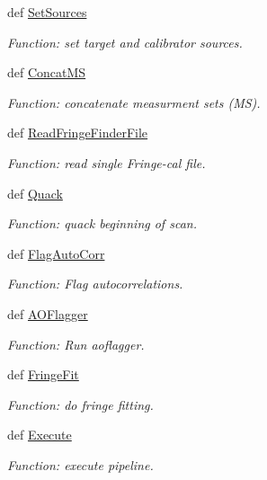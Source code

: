 \begin{DoxyCompactItemize}
def \hyperlink{class_pipeline_1_1_pipeline_a4f45319f19f9fd40aba97cc0bc0bca47}{\-Set\-Sources}
\begin{DoxyCompactList}\small\item\em \-Function\-: set target and calibrator sources. \end{DoxyCompactList}\item 
def \hyperlink{class_pipeline_1_1_pipeline_a0a01f403748ac0aed6bdefec04966766}{\-Concat\-M\-S}
\begin{DoxyCompactList}\small\item\em \-Function\-: concatenate measurment sets (\-M\-S). \end{DoxyCompactList}\item 
def \hyperlink{class_pipeline_1_1_pipeline_ae8a9cee7f6f30619770ec21b88b6e821}{\-Read\-Fringe\-Finder\-File}
\begin{DoxyCompactList}\small\item\em \-Function\-: read single \-Fringe-\/cal file. \end{DoxyCompactList}\item 
def \hyperlink{class_pipeline_1_1_pipeline_a553b5f0d2a24d7e7c5430d7129623f19}{\-Quack}
\begin{DoxyCompactList}\small\item\em \-Function\-: quack beginning of scan. \end{DoxyCompactList}\item 
def \hyperlink{class_pipeline_1_1_pipeline_ab83ee9a420c9f4c56bf167d0bd67ab26}{\-Flag\-Auto\-Corr}
\begin{DoxyCompactList}\small\item\em \-Function\-: \-Flag autocorrelations. \end{DoxyCompactList}\item 
def \hyperlink{class_pipeline_1_1_pipeline_a760e50e18ff811af0b658990d7606547}{\-A\-O\-Flagger}
\begin{DoxyCompactList}\small\item\em \-Function\-: \-Run aoflagger. \end{DoxyCompactList}\item 
def \hyperlink{class_pipeline_1_1_pipeline_aceecbd4bd1dc5a4badf4982f986dee1f}{\-Fringe\-Fit}
\begin{DoxyCompactList}\small\item\em \-Function\-: do fringe fitting. \end{DoxyCompactList}\item 
def \hyperlink{class_pipeline_1_1_pipeline_aebb8b640e2cdf9ace841c24b594c359e}{\-Execute}
\begin{DoxyCompactList}\small\item\em \-Function\-: execute pipeline. \end{DoxyCompactList}\end{DoxyCompactItemize}
